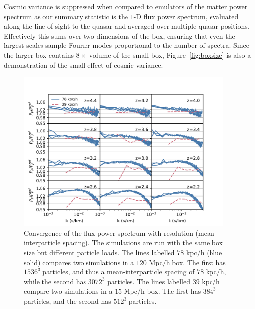 \documentclass[a4paper,11pt]{article}
\begin{document}
Cosmic variance is suppressed when compared to emulators of the matter power spectrum as our summary statistic is the $1$-D flux power spectrum, evaluated along the line of sight to the quasar and averaged over multiple quasar positions. Effectively this sums over two dimensions of the box, ensuring that even the largest scales sample Fourier modes proportional to the number of spectra. Since the larger box contains $8\times$ volume of the small box, Figure~\ref{fig:boxsize} is also a demonstration of the small effect of cosmic variance.

\begin{figure}
\includegraphics[width=0.95\textwidth,trim={0 0 1cm 0},clip]{figures/resolution-convergence.pdf}
 \caption{Convergence of the flux power spectrum with resolution (mean interparticle spacing). The simulations are run with the same box size but different particle loads. The lines labelled $78$ kpc/h (blue solid) compares two simulations in a $120$ Mpc/h box. The first has $1536^3$ particles, and thus a mean-interparticle spacing of $78$ kpc/h, while the second has $3072^3$ particles. The lines labelled $39$ kpc/h compare two simulations in a $15$ Mpc/h box. The first has $384^3$ particles, and the second has $512^3$ particles.}
 \label{fig:resolution}
\end{figure}
\end{document}
